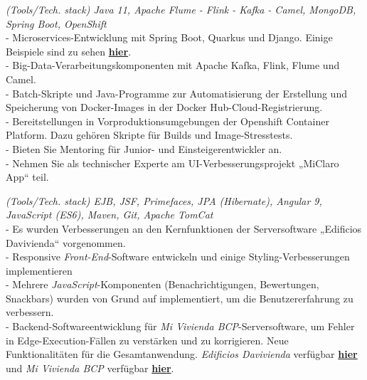 \documentclass[]{CV-JuanCamiloFlorez}
\begin{document}
\begin{minipage}[t]{0.66\textwidth}
    \noindent
    \textit{(Tools/Tech. stack) Java 11, Apache Flume - Flink - Kafka - Camel, MongoDB, Spring Boot, OpenShift} \\
        - Microservices-Entwicklung mit Spring Boot, Quarkus und Django. Einige Beispiele sind zu sehen \textbf{\href{https://github.com/VanJFlorez/flink-kafka-fraud-detection}{hier}}. \\
        - Big-Data-Verarbeitungskomponenten mit Apache Kafka, Flink, Flume und Camel. \\
        - Batch-Skripte und Java-Programme zur Automatisierung der Erstellung und Speicherung von Docker-Images in der Docker Hub-Cloud-Registrierung. \\
        - Bereitstellungen in Vorproduktionsumgebungen der Openshift Container Platform. Dazu gehören Skripte für Builds und Image-Stresstests. \\
        - Bieten Sie Mentoring für Junior- und Einsteigerentwickler an. \\
        - Nehmen Sie als technischer Experte am UI-Verbesserungsprojekt „MiClaro App“ teil. \\
        \sectionsep

    \noindent
    \textit{(Tools/Tech. stack) EJB, JSF, Primefaces, JPA (Hibernate), Angular 9, JavaScript (ES6), Maven, Git, Apache TomCat} \\
        - Es wurden Verbesserungen an den Kernfunktionen der Serversoftware „Edificios Davivienda“ vorgenommen. \\
        - Responsive \textit{Front-End}-Software entwickeln und einige Styling-Verbesserungen implementieren \\
        - Mehrere \textit{JavaScript}-Komponenten (Benachrichtigungen, Bewertungen, Snackbars) wurden von Grund auf implementiert, um die Benutzererfahrung zu verbessern. \\
        - Backend-Softwareentwicklung für \textit{Mi Vivienda BCP}-Serversoftware, um Fehler in Edge-Execution-Fällen zu verstärken und zu korrigieren. Neue Funktionalitäten für die Gesamtanwendung. \textit{Edificios Davivienda} verfügbar \textbf{\href{https://www.edificiosdavivienda.com}{hier}} und \textit{Mi Vivienda BCP} verfügbar \textbf{\href{https://www.miviviendabcp.com.bo}{hier}}. \\
        \sectionsep


\end{minipage}
\end{document}

